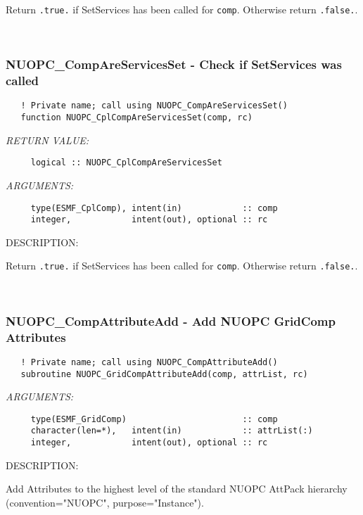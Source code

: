     Return {\tt .true.} if SetServices has been called for {\tt comp}. 
     Otherwise return {\tt .false.}. 
 
\mbox{}\hrulefill\ 
 
\subsubsection [NUOPC\_CompAreServicesSet] {NUOPC\_CompAreServicesSet - Check if SetServices was called}


\begin{verbatim}   ! Private name; call using NUOPC_CompAreServicesSet() 
   function NUOPC_CplCompAreServicesSet(comp, rc)\end{verbatim}{\em RETURN VALUE:}
\begin{verbatim}     logical :: NUOPC_CplCompAreServicesSet\end{verbatim}{\em ARGUMENTS:}
\begin{verbatim}     type(ESMF_CplComp), intent(in)            :: comp
     integer,            intent(out), optional :: rc\end{verbatim}
{\sf DESCRIPTION:\\ }


     Return {\tt .true.} if SetServices has been called for {\tt comp}.
     Otherwise return {\tt .false.}. 
 
\mbox{}\hrulefill\ 
 
\subsubsection [NUOPC\_CompAttributeAdd] {NUOPC\_CompAttributeAdd - Add NUOPC GridComp Attributes}


\begin{verbatim}   ! Private name; call using NUOPC_CompAttributeAdd() 
   subroutine NUOPC_GridCompAttributeAdd(comp, attrList, rc)\end{verbatim}{\em ARGUMENTS:}
\begin{verbatim}     type(ESMF_GridComp)                       :: comp
     character(len=*),   intent(in)            :: attrList(:)
     integer,            intent(out), optional :: rc\end{verbatim}
{\sf DESCRIPTION:\\ }


     Add Attributes to the highest level of the standard NUOPC AttPack
     hierarchy (convention="NUOPC", purpose="Instance"). 
 
